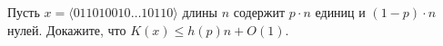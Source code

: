 Пусть $x = \langle{011010010 \dotso 10110}\rangle$ длины $n$ содержит $p \cdot n$ единиц и $(1 - p) \cdot
n$ нулей. Докажите, что $K(x) \le h(p) n + O(1)$.